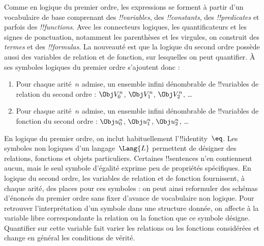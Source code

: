 \documentclass[../../../include/open-logic-section]{subfiles}
\begin{document}


Comme en logique du premier ordre, les expressions
se forment à partir d'un vocabulaire de base
comprenant des \emph{!!{variable}s}, des
\emph{!!{constant}s}, des \emph{!!{predicate}s}
et parfois des \emph{!!{function}s}. Avec les
connecteurs logiques, les quantificateurs et les
signes de ponctuation, notamment les parenthèses
et les virgules, on construit des \emph{termes}
et des \emph{!!{formula}s}. La nouveauté est que
la logique du second ordre possède aussi des
variables de relation et de fonction, sur lesquelles
on peut quantifier. À ses symboles logiques du
premier ordre s'ajoutent donc :

\begin{enumerate}
\item Pour chaque arité~$n$ admise, un ensemble
  infini dénombrable de !!{variable}s de relation
  du second ordre :
  $\Obj V_0^n$, $\Obj V_1^n$, $\Obj V_2^n$, \dots
\item Pour chaque arité~$n$ admise, un ensemble
  infini dénombrable de !!{variable}s de fonction
  du second ordre :
  $\Obj u_0^n$, $\Obj u_1^n$, $\Obj u_2^n$, \dots
\end{enumerate}

En logique du premier ordre, on inclut
habituellement l'!!{identity}~$\eq$.
Les symboles non logiques d'un langage~$\Lang{L}$
permettent de désigner des relations, fonctions
et objets particuliers. Certaines !!{sentence}s
n'en contiennent aucun, mais le seul symbole
d'égalité exprime peu de propriétés spécifiques.
En logique du second ordre, les variables de
relation et de fonction fournissent, à chaque
arité, des places pour ces symboles : on peut
ainsi reformuler des schémas d'énoncés du premier
ordre sans fixer d'avance de vocabulaire non
logique. Pour retrouver l'interprétation d'un
symbole dans une structure donnée, on affecte à
la variable libre correspondante la relation ou
la fonction que ce symbole désigne. Quantifier
sur cette variable fait varier les relations ou
les fonctions considérées et change en général
les conditions de vérité.
\end{document}
